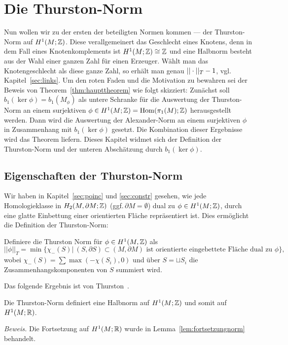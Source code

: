 
\section{Die Thurston-Norm}
	
	Nun wollen wir zu der ersten der beteiligten Normen kommen --- der Thurston-Norm auf $H^1(M;\mathbb{Z})$. Diese verallgemeinert das Geschlecht eines Knotens, denn in dem Fall eines Knotenkomplements ist $H^1(M;\mathbb{Z})\cong \mathbb{Z}$ und eine Halbnorm besteht aus der Wahl einer ganzen Zahl für einen Erzeuger. Wählt man das Knotengeschlecht als diese ganze Zahl, so erhält man genau $||\cdot||_T -1$, vgl.\,Kapitel~\ref{sec:links}. Um den roten Faden und die Motivation zu bewahren sei der Beweis von Theorem~\ref{thm:haupttheorem} wie folgt skizziert: Zunächst soll $b_1(\ker\phi)=b_1(M_\phi)$ als untere Schranke für die Auswertung der Thurston-Norm an einem surjektiven $\phi \in H^1(M;\mathbb{Z}) = \operatorname{Hom} (\pi_1(M);\mathbb{Z})$ herausgestellt werden. Dann wird die Auswertung der Alexander-Norm an einem surjektiven $\phi$ in Zusammenhang mit $b_1(\ker\phi)$ gesetzt. Die Kombination dieser Ergebnisse wird das Theorem liefern. Dieses Kapitel widmet sich der Definition der Thurston-Norm und der unteren Abschätzung durch $b_1(\ker\phi)$.

	\subsection{Eigenschaften der Thurston-Norm}
		\label{sec:thurstondef}
        Wir haben in Kapitel~\ref{sec:poinc} und \ref{sec:constr} gesehen, wie jede Homologieklasse in $H_2(M,\partial M;\mathbb{Z})$ (ggf.\,$\partial M=\emptyset$) dual zu $\phi \in H^1(M;\mathbb{Z})$, durch eine glatte Einbettung einer orientierten Fläche repräsentiert ist. Dies  ermöglicht die Definition der Thurston-Norm:
        \begin{defn}
        	Definiere die Thurston Norm für $\phi \in H^1(M,\mathbb{Z})$ als
        	\[
        	        		||\phi||_T = \min\{ \chi_-(S)| ~(S,\partial S) \subset (M,\partial M)\text{ ist orientierte eingebettete Fläche dual zu } \phi \},
        	        	\]        	
        	wobei $\chi_-(S)=\sum \max (-\chi(S_i),0)$ und über $S=\sqcup S_i$ die Zusammenhangskomponenten von $S$ summiert wird.
        \end{defn}
        
        Das folgende Ergebnis ist von Thurston~\cite{Thurston.1986}.
        \begin{lem}
        \label{lem:norm}
        	Die Thurston-Norm definiert eine Halbnorm auf $H^1(M;\mathbb{Z})$ und somit auf $H^1(M;\mathbb{R})$. 
        \end{lem}
          \noindent\textit{Beweis.}
          Die Fortsetzung auf $H^1(M;\mathbb{R})$ wurde in Lemma~\ref{lem:fortsetzungnorm} behandelt.

